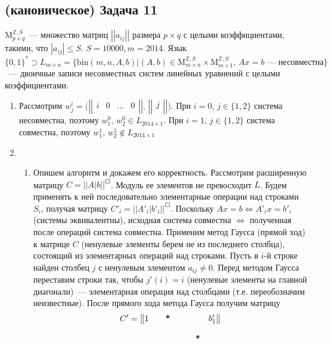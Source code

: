 \documentclass[a4paper]{article}
\newcommand{\matrixl}{\left|\left|}
\newcommand{\matrixr}{\right|\right|}
\begin{document}
\subsection*{(каноническое) Задача 11}
$\mbox{M}^{\mathbb{Z}, S}_{p\times q}$~--- множество матриц $\matrixl a_{ij} \matrixr$ размера $p\times q$ с целыми коэффициентами, такими, что $|a_{ij}|\leqslant S$. $S=10000, m=2014$. Язык $\{0,1\}^*\supset L_{m\times n}=\{\mbox{bin}(m,n,A,b)\big|(A,b)\in\mbox{M}^{\mathbb{Z}, S}_{m\times n}\times \mbox{M}^{\mathbb{Z}, S}_{m\times 1},\,Ax=b\mbox{~--- несовместна}\}$~--- двоичные записи несовместных систем линейных уравнений с целыми коэффициентами.
\begin{enumerate}
\item Рассмотрим $w^i_j=\big(\matrixl\begin{array}{cccc}
i & 0 & ... & 0\\
\end{array}\matrixr,\,\matrixl
\begin{array}{c}
j\\
\end{array}\matrixr\big)$. При $i=0,\,j\in\{1,2\}$ система несовместна, поэтому $w^0_1,\,w^0_2\in L_{2014\times 1}$. При $i=1,\,j\in\{1,2\}$ система совместна, поэтому $w^1_1,\,w^1_2\notin L_{2014\times 1}$
\item \begin{enumerate}
\item Опишем алгоритм и докажем его корректность. Рассмотрим расширенную матрицу $C={\matrixl A\big| b \matrixr}^{\Square}$. Модуль ее элементов не превосходит $L$. Будем применять к ней последовательно элементарные операции над строками $S_i$, получая матрицу $C'_i={\matrixl A'_i\big| b'_i \matrixr}^{\Square}$. Поскольку $Ax=b\Leftrightarrow A'_ix=b'_i$ (системы эквивалентны), исходная система совместна $\Leftrightarrow$ полученная после операций система совместна. Применим метод Гаусса (прямой ход) к матрице $C$ (ненулевые элементы берем не из последнего столбца), состоящий из элементарных операций над строками. Пусть в $i$-й строке найден столбец $j$ с ненулевым элементом $a_{ij}\neq 0$. Перед методом Гаусса переставим строки так, чтобы $j'(i)=i$ (ненулевые элементы на главной диагонали)~--- элементарная операция над столбцами (т.е. переобозначим неизвестные). После прямого хода метода Гаусса получим матрицу
$$C'=
\begin{Vmatrix}
1 & & \mbox{\bf{*}} &&& \multirow{5}{*}{\mbox{\bf{*}}} & b'_1\\

\end{Vmatrix}$$
\end{enumerate}
\end{enumerate}
\end{document}
